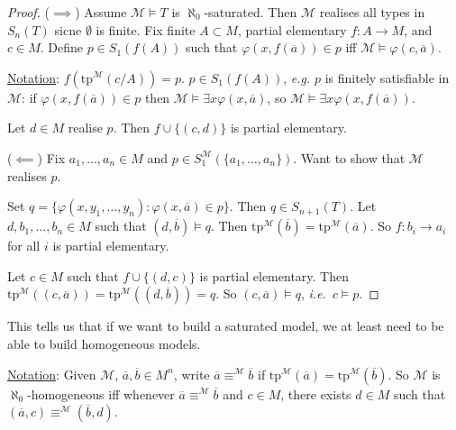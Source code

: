 \documentclass[]{article}
\theoremstyle{custhm}
\theoremstyle{cusdef}
\theoremstyle{custhm}
\theoremstyle{custhm}
\theoremstyle{custhm}
\theoremstyle{ex}
\theoremstyle{custhm}
\theoremstyle{cusdef}
\theoremstyle{remark}
\theoremstyle{remark}
\newcommand{\ra}{\rightarrow}
\newcommand{\ie}{\textit{i.e.}}
\renewcommand{\it}[1]{\textit{#1}}
\newcommand{\M}{\mathcal{M}}
\renewcommand{\phi}{\varphi}
\renewcommand{\bar}{\overline}
\newcommand{\tp}{\textrm{tp}}
\begin{document}
\begin{proof}
($\implies$) Assume $\M\models T$ is $\aleph_0$-saturated. Then $\M$ realises all types in $S_n(T)$ sicne $\emptyset$ is finite. Fix finite $A\subset M$, partial elementary $f:A\ra M$, and $c\in M$. Define $p\in S_1(f(A))$ such that $\phi(x,f(\bar{a}))\in p$ iff $\M\models \phi(c,\bar{a})$.

\underline{Notation}: $f(\tp^\M(c/A)) = p$. $p \in S_1(f(A))$, \it{e.g.} $p$ is finitely satisfiable in $\M$: if $\phi(x,f(\bar{a}))\in p$ then $\M\models \exists x \phi(x,\bar{a})$, so $\M\models \exists x \phi(x,f(\bar{a}))$.

Let $d \in M$ realise $p$. Then $f\cup\{(c,d)\}$ is partial elementary.

($\impliedby$) Fix $a_1,\dots,a_n\in M$ and $p\in S_1^\M(\{a_1,\dots,a_n\})$. Want to show that $\M$ realises $p$.

Set $q = \{\phi(x,y_1,\dots,y_n):\phi(x,\bar{a})\in p\}$. Then $q \in S_{n+1}(T)$. Let $d,b_1,\dots,b_n \in M$ such that $(d,\bar{b})\models q$. Then $\tp^\M(\bar{b}) = \tp^\M(\bar{a})$. So $f:b_i\ra a_i$ for all $i$ is partial elementary.

Let $c\in M$ such that $f\cup \{(d,c)\}$ is partial elementary. Then $\tp^\M((c,\bar{a})) = \tp^\M((d,\bar{b})) = q$. So $(c,\bar{a})\models q$, \ie\ $c\models p$.
\end{proof}

This tells us that if we want to build a saturated model, we at least need to be able to build homogeneous models.

\underline{Notation}: Given $\M$, $\bar{a},\bar{b}\in M^n$, write $\bar{a}\equiv^\M\bar{b}$ if $\tp^\M(\bar{a}) = \tp^\M(\bar{b})$. So $\M$ is $\aleph_0$-homogeneous iff whenever $\bar{a}\equiv^\M\bar{b}$ and $c\in M$, there exists $d\in M$ such that $(\bar{a},c) \equiv^\M (\bar{b},d)$.
\end{document}
